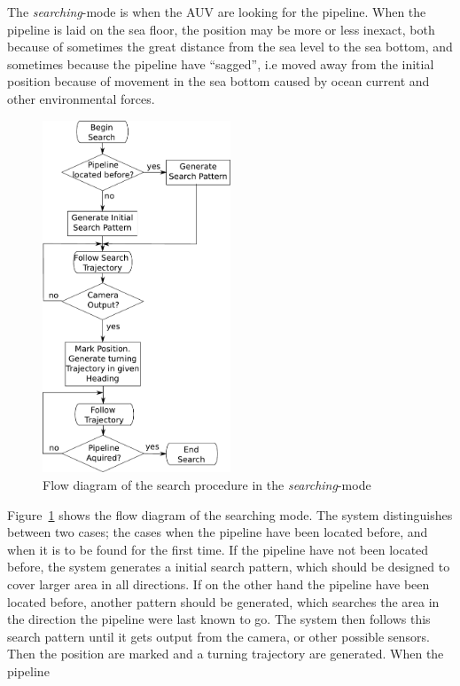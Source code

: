 	The \textit{searching}-mode is when the AUV are looking for the pipeline. When the pipeline is laid
	on the sea floor, the position may be more or less inexact, both because of sometimes the great 
	distance from the sea level to the sea bottom, and sometimes because the pipeline have ``sagged'', 
	i.e moved away from the initial position because of movement in the sea bottom caused by ocean current
	and other environmental forces. 

	\begin{figure}[htbp]
		\centering
		\includegraphics[width=0.5\textwidth]{pics/search_flow}
		\caption{Flow diagram of the search procedure in the \textit{searching}-mode}
		\label{fig:ch2-search-flow}
	\end{figure}
	Figure~\ref{fig:ch2-search-flow} shows the flow diagram of the searching mode. The system distinguishes 
	between two cases; the cases when the pipeline have been located before, and when it is to be found for
	the first time. If the pipeline have not been located before, the system generates a initial
	search pattern, which should be designed to cover larger area in all directions. If on the other hand the
	pipeline have been located before, another pattern should be generated, which searches the area in the direction
	the pipeline were last known to go. The
	system then follows this search pattern until it gets output from the camera, or other possible
	sensors. Then the position are marked and a turning trajectory are generated. When the pipeline
